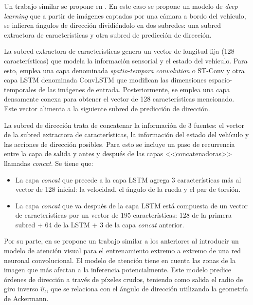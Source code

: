 Un trabajo similar se propone en \cite{deep-steering}. En este caso se propone un modelo de \textit{deep learning} que a partir de imágenes captadas por una cámara a bordo del vehiculo, se infieren ángulos de dirección dividiéndolo en dos subredes: una subred extractora de características y otra subred de predicción de dirección.

La subred extractora de características genera un vector de longitud fija (128 características) que modela la información sensorial y el estado del vehículo. Para esto, emplea una capa denominada \textit{spatio-tempora convolution} o ST-Conv y otra capa LSTM denominada ConvLSTM que modifican las dimensiones espacio-temporales de las imágenes de entrada. Posteriormente, se emplea una capa densamente conexa para obtener el vector de 128 características mencionado. Este vector alimenta a la siguiente subred de predicción de dirección.

La subred de dirección trata de concatenar la información de 3 fuentes: el vector de la subred extractora de características, la información del estado del vehículo y las acciones de dirección posibles. Para esto se incluye un paso de recurrencia entre la capa de salida y antes y después de las capas <<concatenadoras>> llamadas \textit{concat}. Se tiene que:

\begin{itemize}
    \item La capa \textit{concat} que precede a la capa LSTM agrega 3 características más al vector de 128 inicial: la velocidad, el ángulo de la rueda y el par de torsión.
    \item La capa \textit{concat} que va después de la capa LSTM está compuesta de un vector de características por un vector de 195 características: 128 de la primera subred + 64 de la LSTM + 3 de la capa \textit{concat} anterior.
\end{itemize}

Por su parte, en \cite{interpretable} se propone un trabajo similar a los anteriores al introducir un modelo de atención visual para el entrenamiento extremo a extremo de una red neuronal convolucional. El modelo de atención tiene en cuenta las zonas de la imagen que más afectan a la inferencia potencialmente. Este modelo predice órdenes de dirección a través de píxeles crudos, teniendo como salida el radio de giro inverso $\hat{u}_t$, que se relaciona con el ángulo de dirección utilizando la geometría de Ackermann.

